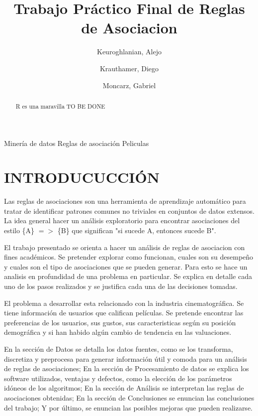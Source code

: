 \documentclass[journal]{IEEEtran}
\begin{document}
\title{Trabajo Práctico Final de Reglas de Asociacion}
\author{
	Keuroghlanian, Alejo \\
	\and
	Krauthamer, Diego \\
	\and
	Moncarz, Gabriel}
\maketitle %

\begin{abstract}
R es una maravilla
TO BE DONE
\end{abstract}

\begin{IEEEkeywords}
Minería de datos
Reglas de asociación
Peliculas
\end{IEEEkeywords}







\section{INTRODUCUCCIÓN}

Las reglas de asociaciones son una herramienta de aprendizaje automático para
tratar de identificar patrones comunes no triviales en conjuntos de datos
extensos. La idea general hacer un análisis exploratorio para  encontrar 
asociaciones del estilo \{A\} $=$$>$ \{B\} que significan 
"si sucede A, entonces sucede B". 

El trabajo presentado se orienta a hacer un análisis de reglas de asociacion con
fines académicos. Se pretender explorar como funcionan, cuales son  su desempeño y
cuales son el tipo de asociaciones que se pueden generar. Para esto se
hace un analisis en profundidad de una problema en particular. Se
explica en detalle cada uno de los pasos realizados y se justifica cada una de 
las decisiones tomadas.

El problema a desarrollar esta relacionado con la industria cinematográfica.
Se tiene información de usuarios que califican películas. Se pretende encontrar
las preferencias de los usuarios, sus gustos, sus caracteristicas según su
posición demográfica y si han habido algún cambio de tendencia en las valuaciones.

En la sección de Datos se detalla los datos fuentes, como se los transforma,
discretiza y preprocesa para generar información útil y comoda para un análisis
de reglas de asociaciones; En la sección de Procesamiento de datos se 
explica los software utilizados, ventajas y defectos, como la elección de los
parámetros idóneos de los algoritmos; En la sección de Análisis se interpretan
las reglas de asociaciones obtenidas; En la sección de Conclusiones se enuncian
las conclusiones del trabajo; Y por último, se enuncian las posibles mejoras
que pueden realizarse.
\end{document}

